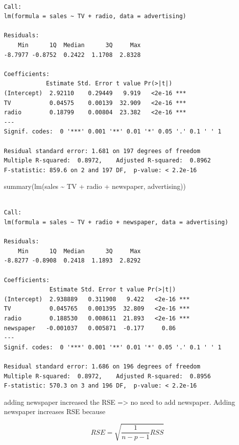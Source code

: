 \documentclass[
  letterpaper,
  DIV=11,
  numbers=noendperiod]{scrreprt}
\newenvironment{Shaded}{\begin{snugshade}}{\end{snugshade}}
\newcommand{\FunctionTok}[1]{\textcolor[rgb]{0.02,0.16,0.49}{#1}}
\newcommand{\NormalTok}[1]{\textcolor[rgb]{0.33,0.33,0.33}{#1}}
\newcommand{\SpecialCharTok}[1]{\textcolor[rgb]{0.00,0.46,0.62}{#1}}
\begin{document}
\begin{verbatim}

Call:
lm(formula = sales ~ TV + radio, data = advertising)

Residuals:
    Min      1Q  Median      3Q     Max 
-8.7977 -0.8752  0.2422  1.1708  2.8328 

Coefficients:
            Estimate Std. Error t value Pr(>|t|)    
(Intercept)  2.92110    0.29449   9.919   <2e-16 ***
TV           0.04575    0.00139  32.909   <2e-16 ***
radio        0.18799    0.00804  23.382   <2e-16 ***
---
Signif. codes:  0 '***' 0.001 '**' 0.01 '*' 0.05 '.' 0.1 ' ' 1

Residual standard error: 1.681 on 197 degrees of freedom
Multiple R-squared:  0.8972,    Adjusted R-squared:  0.8962 
F-statistic: 859.6 on 2 and 197 DF,  p-value: < 2.2e-16
\end{verbatim}

\begin{Shaded}
\begin{Highlighting}[]
\FunctionTok{summary}\NormalTok{(}\FunctionTok{lm}\NormalTok{(sales }\SpecialCharTok{\textasciitilde{}}\NormalTok{ TV }\SpecialCharTok{+}\NormalTok{ radio }\SpecialCharTok{+}\NormalTok{ newspaper, advertising))}
\end{Highlighting}
\end{Shaded}

\begin{verbatim}

Call:
lm(formula = sales ~ TV + radio + newspaper, data = advertising)

Residuals:
    Min      1Q  Median      3Q     Max 
-8.8277 -0.8908  0.2418  1.1893  2.8292 

Coefficients:
             Estimate Std. Error t value Pr(>|t|)    
(Intercept)  2.938889   0.311908   9.422   <2e-16 ***
TV           0.045765   0.001395  32.809   <2e-16 ***
radio        0.188530   0.008611  21.893   <2e-16 ***
newspaper   -0.001037   0.005871  -0.177     0.86    
---
Signif. codes:  0 '***' 0.001 '**' 0.01 '*' 0.05 '.' 0.1 ' ' 1

Residual standard error: 1.686 on 196 degrees of freedom
Multiple R-squared:  0.8972,    Adjusted R-squared:  0.8956 
F-statistic: 570.3 on 3 and 196 DF,  p-value: < 2.2e-16
\end{verbatim}

adding newspaper increased the RSE =\textgreater{} no need to add
newspaper. Adding newspaper increases RSE because

\[
RSE = \sqrt{\frac{1}{n-p-1}RSS}
\]
\end{document}
